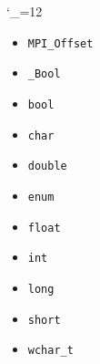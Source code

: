 \begin{multicols}{3}
\catcode`\_=12
\footnotesize
\begin{itemize}
\item \texttt{MPI_Offset}~\pageref{def:MPI_Offset}
\item \texttt{_Bool}~\pageref{def:_Bool}
\item \texttt{bool}~\pageref{def:bool}
\item \texttt{char}~\pageref{def:char}
\item \texttt{double}~\pageref{def:double}
\item \texttt{enum}~\pageref{def:enum}
\item \texttt{float}~\pageref{def:float}
\item \texttt{int}~\pageref{def:int}
\item \texttt{long}~\pageref{def:long}
\item \texttt{short}~\pageref{def:short}
\item \texttt{wchar_t}~\pageref{def:wchar_t}
\end{itemize}
\end{multicols}
